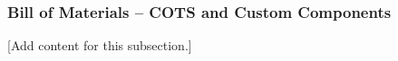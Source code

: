 
\subsubsection{Bill of Materials -- COTS and Custom Components}
\label{subsubsec:design_1_1_3_bill_of_materials}

[Add content for this subsection.]
